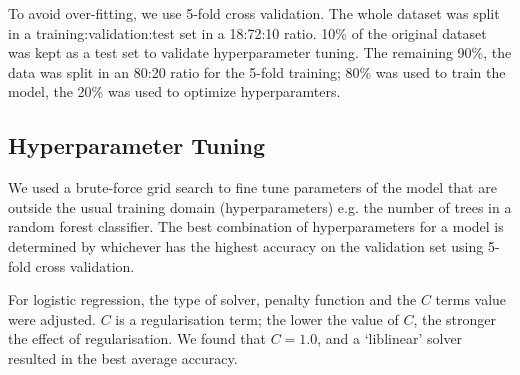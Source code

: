 To avoid over-fitting, we use 5-fold cross validation. The whole dataset was split in a training:validation:test set in a 18:72:10 ratio. 10\% of the original dataset was kept as a test set to validate hyperparameter tuning. The remaining 90\%, the data was split in an 80:20 ratio for the 5-fold training; 80\% was used to train the model, the 20\% was used to optimize hyperparamters. %

\subsection{Hyperparameter Tuning} \label{hpt}
We used a brute-force grid search to fine tune parameters of the model that are outside the usual training domain (hyperparameters) e.g. the number of trees in a random forest classifier.
The best combination of hyperparameters for a model is determined by whichever has the highest accuracy on the validation set using 5-fold cross validation.

For logistic regression, the type of solver, penalty function and the $C$  terms value were adjusted. $C$ is a regularisation term; 
the lower the value of $C$, the stronger the effect of regularisation. We found that  $C=1.0$, and a `liblinear' solver resulted in the best average accuracy.

